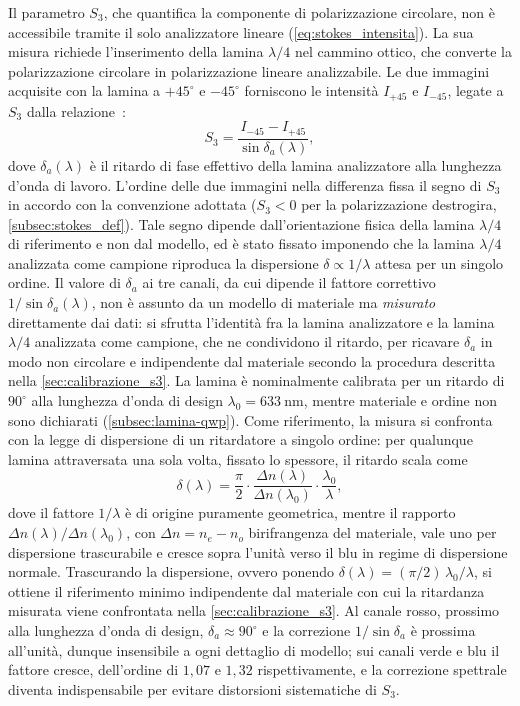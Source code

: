 Il parametro $S_3$, che quantifica la componente di polarizzazione circolare, non è accessibile tramite il solo analizzatore lineare (\cref{eq:stokes_intensita}). La sua misura richiede l'inserimento della lamina $\lambda/4$ nel cammino ottico, che converte la polarizzazione circolare in polarizzazione lineare analizzabile. Le due immagini acquisite con la lamina a $+45^\circ$ e $-45^\circ$ forniscono le intensità $I_{+45}$ e $I_{-45}$, legate a $S_3$ dalla relazione~\cite{manuale_polarizzazione}:
\begin{equation}
    S_3 = \frac{I_{-45} - I_{+45}}{\sin\delta_a(\lambda)},
    \label{eq:s3_formula}
\end{equation}
dove $\delta_a(\lambda)$ è il ritardo di fase effettivo della lamina analizzatore alla lunghezza d'onda di lavoro. L'ordine delle due immagini nella differenza fissa il segno di $S_3$ in accordo con la convenzione adottata ($S_3 < 0$ per la polarizzazione destrogira, \cref{subsec:stokes_def}). Tale segno dipende dall'orientazione fisica della lamina $\lambda/4$ di riferimento e non dal modello, ed è stato fissato imponendo che la lamina $\lambda/4$ analizzata come campione riproduca la dispersione $\delta \propto 1/\lambda$ attesa per un singolo ordine. Il valore di $\delta_a$ ai tre canali, da cui dipende il fattore correttivo $1/\sin\delta_a(\lambda)$, non è assunto da un modello di materiale ma \emph{misurato} direttamente dai dati: si sfrutta l'identità fra la lamina analizzatore e la lamina $\lambda/4$ analizzata come campione, che ne condividono il ritardo, per ricavare $\delta_a$ in modo non circolare e indipendente dal materiale secondo la procedura descritta nella \cref{sec:calibrazione_s3}. La lamina è nominalmente calibrata per un ritardo di $90^\circ$ alla lunghezza d'onda di design $\lambda_0 = \SI{633}{\nano\meter}$, mentre materiale e ordine non sono dichiarati (\cref{subsec:lamina-qwp}). Come riferimento, la misura si confronta con la legge di dispersione di un ritardatore a singolo ordine: per qualunque lamina attraversata una sola volta, fissato lo spessore, il ritardo scala come
\begin{equation}
    \delta(\lambda) = \frac{\pi}{2} \cdot \frac{\Delta n(\lambda)}{\Delta n(\lambda_0)} \cdot \frac{\lambda_0}{\lambda},
    \label{eq:dispersione-qwp}
\end{equation}
dove il fattore $1/\lambda$ è di origine puramente geometrica, mentre il rapporto $\Delta n(\lambda)/\Delta n(\lambda_0)$, con $\Delta n = n_e - n_o$ birifrangenza del materiale, vale uno per dispersione trascurabile e cresce sopra l'unità verso il blu in regime di dispersione normale. Trascurando la dispersione, ovvero ponendo $\delta(\lambda) = (\pi/2)\,\lambda_0/\lambda$, si ottiene il riferimento minimo indipendente dal materiale con cui la ritardanza misurata viene confrontata nella \cref{sec:calibrazione_s3}. Al canale rosso, prossimo alla lunghezza d'onda di design, $\delta_a \approx 90^\circ$ e la correzione $1/\sin\delta_a$ è prossima all'unità, dunque insensibile a ogni dettaglio di modello; sui canali verde e blu il fattore cresce, dell'ordine di $1{,}07$ e $1{,}32$ rispettivamente, e la correzione spettrale diventa indispensabile per evitare distorsioni sistematiche di $S_3$.

